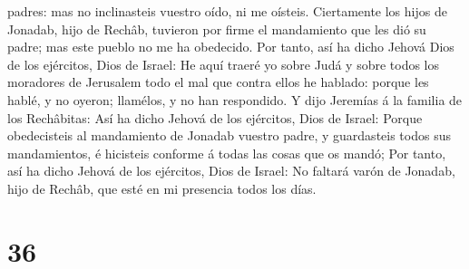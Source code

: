 padres: mas no inclinasteis vuestro oído, ni me oísteis. 
Ciertamente los hijos de Jonadab, hijo de Rechâb, tuvieron por firme el
mandamiento que les dió su padre; mas este pueblo no me ha obedecido.
 Por tanto, así ha dicho Jehová Dios de los ejércitos, Dios
de Israel: He aquí traeré yo sobre Judá y sobre todos los moradores de
Jerusalem todo el mal que contra ellos he hablado: porque les hablé, y
no oyeron; llamélos, y no han respondido.  Y dijo Jeremías
á la familia de los Rechâbitas: Así ha dicho Jehová de los ejércitos,
Dios de Israel: Porque obedecisteis al mandamiento de Jonadab vuestro
padre, y guardasteis todos sus mandamientos, é hicisteis conforme á
todas las cosas que os mandó;  Por tanto, así ha dicho
Jehová de los ejércitos, Dios de Israel: No faltará varón de Jonadab,
hijo de Rechâb, que esté en mi presencia todos los días.

\hypertarget{section-35}{%
\section{36}\label{section-35}}

